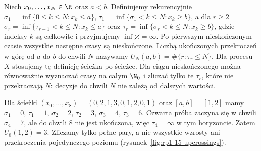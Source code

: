 \begin{definicja}
Niech $x_0,\ldots,x_N\in\R$ oraz $a<b$.
Definiujemy rekurencyjnie
$\sigma_1=\inf\{0\leq k\leq N:x_k\leq a\}$,
$\tau_1=\inf\{\sigma_1<k\leq N:x_k\geq b\}$,
a dla $r\geq2$
$\sigma_r=\inf\{\tau_{r-1}<k\leq N:x_k\leq a\}$
oraz $\tau_r=\inf\{\sigma_r<k\leq N:x_k\geq b\}$,
gdzie indeksy $k$ są całkowite i przyjmujemy
$\inf\varnothing=\infty$.
Po pierwszym nieskończonym czasie wszystkie
następne czasy są nieskończone.
Liczbą ukończonych przekroczeń w górę
od $a$ do $b$ do chwili $N$ nazywamy
$U_N(a,b)=\#\{r:\tau_r\leq N\}$.
Dla procesu $X$ stosujemy tę definicję
ścieżka po ścieżce. Dla ciągu nieskończonego
można równoważnie wyznaczać czasy na całym
$\N_0$ i zliczać tylko te $\tau_r$, które
nie przekraczają $N$: decyzje do chwili $N$
nie zależą od dalszych wartości.
\end{definicja}

\begin{przyklad}
Dla ścieżki
$(x_0,\ldots,x_8)=(0,2,1,3,0,1,2,0,1)$
oraz $[a,b]=[1,2]$ mamy
$\sigma_1=0$, $\tau_1=1$,
$\sigma_2=2$, $\tau_2=3$,
$\sigma_3=4$, $\tau_3=6$.
Czwarta próba zaczyna się w chwili $\sigma_4=7$,
ale do chwili $8$ nie jest ukończona, więc
$\tau_4=\infty$ w tym horyzoncie.
Zatem $U_8(1,2)=3$. Zliczamy tylko pełne pary,
a nie wszystkie wzrosty ani przekroczenia
pojedynczego poziomu (rysunek~\ref{fig:rp1-15-upcrossings}).
\end{przyklad}

